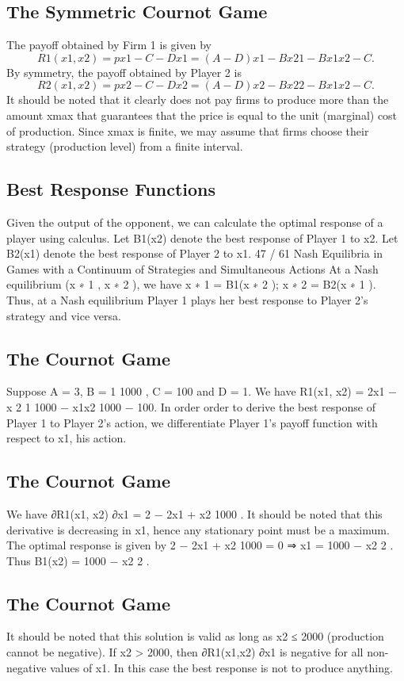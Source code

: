 \documentclass[]{report}
\begin{document}
\subsection{The Symmetric Cournot Game}
The payoff obtained by Firm 1 is given by
\[R1(x1, x2) = px1 − C − Dx1 = (A − D)x1 − Bx2
1 − Bx1x2 − C.\]
By symmetry, the payoff obtained by Player 2 is
\[R2(x1, x2) = px2 − C − Dx2 = (A − D)x2 − Bx2
2 − Bx1x2 − C.\]
It should be noted that it clearly does not pay firms to produce
more than the amount xmax that guarantees that the price is equal
to the unit (marginal) cost of production. Since xmax is finite, we
may assume that firms choose their strategy (production level)
from a finite interval.
\subsection{Best Response Functions}
Given the output of the opponent, we can calculate the optimal
response of a player using calculus.
Let B1(x2) denote the best response of Player 1 to x2.
Let B2(x1) denote the best response of Player 2 to x1.
47 / 61
Nash Equilibria in Games with a Continuum of Strategies
and Simultaneous Actions
At a Nash equilibrium (x
∗
1
, x
∗
2
), we have
x
∗
1 = B1(x
∗
2
); x
∗
2 = B2(x
∗
1
).
Thus, at a Nash equilibrium Player 1 plays her best response to
Player 2’s strategy and vice versa.
\subsection{The Cournot Game}
Suppose A = 3, B =
1
1000 , C = 100 and D = 1.
We have
R1(x1, x2) = 2x1 −
x
2
1
1000
−
x1x2
1000
− 100.
In order order to derive the best response of Player 1 to Player 2’s
action, we differentiate Player 1’s payoff function with respect to
x1, his action.
\subsection{The Cournot Game}
We have
∂R1(x1, x2)
∂x1
= 2 −
2x1 + x2
1000
.
It should be noted that this derivative is decreasing in x1, hence
any stationary point must be a maximum.
The optimal response is given by
2 −
2x1 + x2
1000
= 0 ⇒ x1 = 1000 −
x2
2
.
Thus B1(x2) = 1000 −
x2
2
.
\subsection{The Cournot Game}
It should be noted that this solution is valid as long as x2 ≤ 2000
(production cannot be negative).
If x2 > 2000, then ∂R1(x1,x2)
∂x1
is negative for all non-negative values
of x1.
In this case the best response is not to produce anything.
\end{document}
